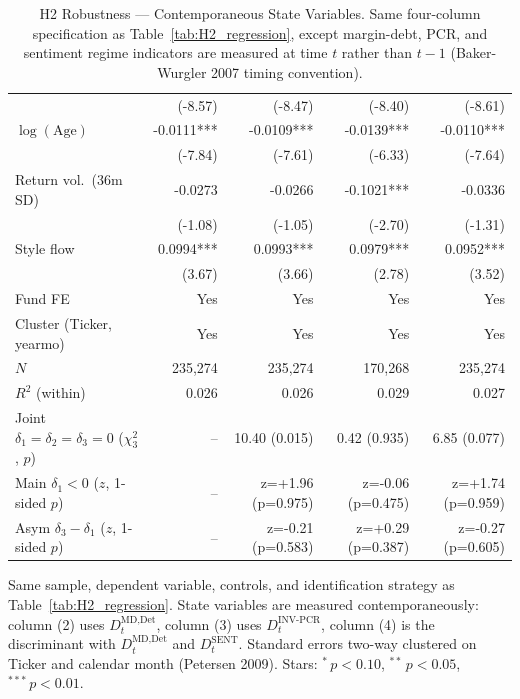 \begin{table}[H]
{\begin{tabular}[t]{lrrrr}
 & (-8.57) & (-8.47) & (-8.40) & (-8.61)\\
$\log(\text{Age})$ & -0.0111*** & -0.0109*** & -0.0139*** & -0.0110***\\
 & (-7.84) & (-7.61) & (-6.33) & (-7.64)\\
Return vol.\ (36m SD) & -0.0273 & -0.0266 & -0.1021*** & -0.0336\\
 & (-1.08) & (-1.05) & (-2.70) & (-1.31)\\
Style flow & 0.0994*** & 0.0993*** & 0.0979*** & 0.0952***\\
 & (3.67) & (3.66) & (2.78) & (3.52)\\
\midrule
Fund FE & Yes & Yes & Yes & Yes\\
Cluster (Ticker, yearmo) & Yes & Yes & Yes & Yes\\
$N$ & 235,274 & 235,274 & 170,268 & 235,274\\
$R^2$ (within) & 0.026 & 0.026 & 0.029 & 0.027\\
Joint $\delta_1=\delta_2=\delta_3=0$ ($\chi^2_3$, $p$) & -- & 10.40 (0.015) & 0.42 (0.935) & 6.85 (0.077)\\
Main $\delta_1<0$ ($z$, 1-sided $p$) & -- & z=+1.96 (p=0.975) & z=-0.06 (p=0.475) & z=+1.74 (p=0.959)\\
Asym $\delta_3-\delta_1$ ($z$, 1-sided $p$) & -- & z=-0.21 (p=0.583) & z=+0.29 (p=0.387) & z=-0.27 (p=0.605)\\
\bottomrule
\end{tabular}%
}
\setlength{\tabletempwidth}{\wd\tabletempbox}
\ifdim\tabletempwidth>\linewidth\setlength{\tabletempwidth}{\linewidth}\fi
\begin{minipage}{\tabletempwidth}
\captionsetup{width=\linewidth}
\caption{\label{tab:H2_contemporaneous}H2 Robustness --- Contemporaneous State Variables. Same four-column specification as Table~\ref{tab:H2_regression}, except margin-debt, PCR, and sentiment regime indicators are measured at time $t$ rather than $t-1$ (Baker-Wurgler 2007 timing convention).}
\ifdim\wd\tabletempbox>\linewidth
  \resizebox{\linewidth}{!}{\usebox{\tabletempbox}}
\else
  \usebox{\tabletempbox}
\fi
\par\medskip
\begin{singlespace}\footnotesize\noindent
Same sample, dependent variable, controls, and identification strategy as Table~\ref{tab:H2_regression}. State variables are measured contemporaneously: column (2) uses $D^{\text{MD,Det}}_t$, column (3) uses $D^{\text{INV-PCR}}_t$, column (4) is the discriminant with $D^{\text{MD,Det}}_t$ and $D^{\text{SENT}}_t$. Standard errors two-way clustered on Ticker and calendar month (Petersen 2009). Stars: $^{*}\,p<0.10$, $^{**}\,p<0.05$, $^{***}\,p<0.01$.
\end{singlespace}
\end{minipage}
\end{table}
